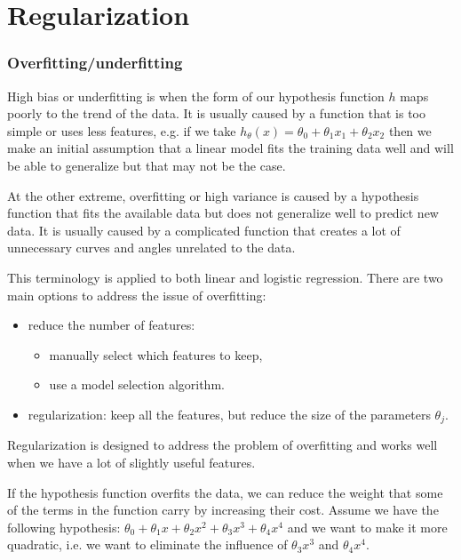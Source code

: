 \documentclass[a4paper,11pt]{report}
\begin{document}
\section{Regularization}

\subsubsection*{Overfitting/underfitting}

High bias or underfitting is when the form of our hypothesis function $h$ maps poorly to the trend of the data. It is usually caused by a function that is too simple or uses less features, e.g. if we take
$h_\theta(x) = \theta_0 + \theta_1x_1 + \theta_2x_2$ then we make an initial assumption that a linear model fits the training data well and will be able to generalize but that may not be the case.

At the other extreme, overfitting or high variance is caused by a hypothesis function that fits the available data but does not generalize well to predict new data. It is usually caused by a complicated function that creates a lot of unnecessary curves and angles unrelated to the data.

This terminology is applied to both linear and logistic regression. There are two main options to address the issue of overfitting:
\begin{itemize}
\item reduce the number of features:
    \begin{itemize}
      \item manually select which features to keep,
      \item use a model selection algorithm.
    \end{itemize}

\item regularization: keep all the features, but reduce the size of the parameters $\theta_j$.
\end{itemize}
Regularization is designed to address the problem of overfitting and works well when we have a lot of slightly useful features.

If the hypothesis function overfits the data, we can reduce the weight that some of the terms in the function carry by increasing their cost. Assume we have the following hypothesis:
$\theta_0 + \theta_1x + \theta_2x^2 + \theta_3x^3 + \theta_4x^4$ and we want to make it more quadratic, i.e. we want to eliminate the influence of $\theta_3x^3$ and $\theta_4x^4$.
\end{document}
